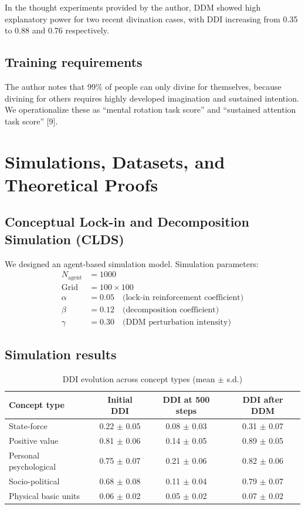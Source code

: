 \documentclass[11pt,a4paper]{article}
\begin{document}
In the thought experiments provided by the author, DDM showed high explanatory power for two recent divination cases, with DDI increasing from 0.35 to 0.88 and 0.76 respectively.

\subsection{Training requirements}

The author notes that 99\% of people can only divine for themselves, because divining for others requires highly developed imagination and sustained intention. We operationalize these as ``mental rotation task score'' and ``sustained attention task score'' [9].

\section{Simulations, Datasets, and Theoretical Proofs}

\subsection{Conceptual Lock-in and Decomposition Simulation (CLDS)}

We designed an agent-based simulation model. Simulation parameters:
\begin{align*}
    N_{\text{agent}} &= 1000 \\
    \text{Grid} &= 100 \times 100 \\
    \alpha &= 0.05 \quad \text{(lock-in reinforcement coefficient)} \\
    \beta &= 0.12 \quad \text{(decomposition coefficient)} \\
    \gamma &= 0.30 \quad \text{(DDM perturbation intensity)}
\end{align*}

\subsection{Simulation results}

\begin{table}[htbp]
\centering
\caption{DDI evolution across concept types (mean $\pm$ s.d.)}
\label{tab:ddi}
\begin{tabular}{@{}lccc@{}}
\toprule
\textbf{Concept type} & \textbf{Initial DDI} & \textbf{DDI at 500 steps} & \textbf{DDI after DDM} \\
\midrule
State-force & 0.22 $\pm$ 0.05 & 0.08 $\pm$ 0.03 & 0.31 $\pm$ 0.07 \\
Positive value & 0.81 $\pm$ 0.06 & 0.14 $\pm$ 0.05 & 0.89 $\pm$ 0.05 \\
Personal psychological & 0.75 $\pm$ 0.07 & 0.21 $\pm$ 0.06 & 0.82 $\pm$ 0.06 \\
Socio-political & 0.68 $\pm$ 0.08 & 0.11 $\pm$ 0.04 & 0.79 $\pm$ 0.07 \\
Physical basic units & 0.06 $\pm$ 0.02 & 0.05 $\pm$ 0.02 & 0.07 $\pm$ 0.02 \\
\bottomrule
\end{tabular}
\end{table}
\end{document}
